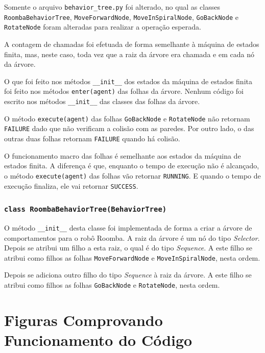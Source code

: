 \documentclass[brazil, 12pt]{article}
\begin{document}
Somente o arquivo \verb|behavior_tree.py| foi alterado, no qual as classes \verb|RoombaBehaviorTree|, \verb|MoveForwardNode|, \verb|MoveInSpiralNode|, \verb|GoBackNode| e \verb|RotateNode| foram alteradas para realizar a operação esperada.

A contagem de chamadas foi efetuada de forma semelhante à máquina de estados finita, mas, neste caso, toda vez que a raiz da árvore era chamada e em cada nó da árvore.

O que foi feito nos métodos \texttt{\_\_init\_\_} dos estados da máquina de estados finita foi feito nos métodos \texttt{enter(agent)} das folhas da árvore. Nenhum código foi escrito nos métodos \texttt{\_\_init\_\_} das classes das folhas da árvore.

O método \texttt{execute(agent)} das folhas \texttt{GoBackNode} e \texttt{RotateNode} não retornam \texttt{FAILURE} dado que não verificam a colisão com as paredes. Por outro lado, o das outras duas folhas retornam \texttt{FAILURE} quando há colisão.

O funcionamento macro das folhas é semelhante aos estados da máquina de estados finita. A diferença é que, enquanto o tempo de execução não é alcançado, o método \texttt{execute(agent)} das folhas vão retornar \texttt{RUNNING}. E quando o tempo de execução finaliza, ele vai retornar \texttt{SUCCESS}.

\subsubsection{\texttt{class RoombaBehaviorTree(BehaviorTree)}}
O método \texttt{\_\_init\_\_} desta classe foi implementada de forma a criar a árvore de comportamentos para o robô Roomba. A raiz da árvore é um nó do tipo \textit{Selector}. Depois se atribui um filho a esta raiz, o qual é do tipo \textit{Sequence}. A este filho se atribui como filhos as folhas \verb|MoveForwardNode| e \verb|MoveInSpiralNode|, nesta ordem.

Depois se adiciona outro filho do tipo \textit{Sequence} à raiz da árvore. A este filho se atribui como filhos as folhas \verb|GoBackNode| e \verb|RotateNode|, nesta ordem.

\section{Figuras Comprovando Funcionamento do Código}
\end{document}
